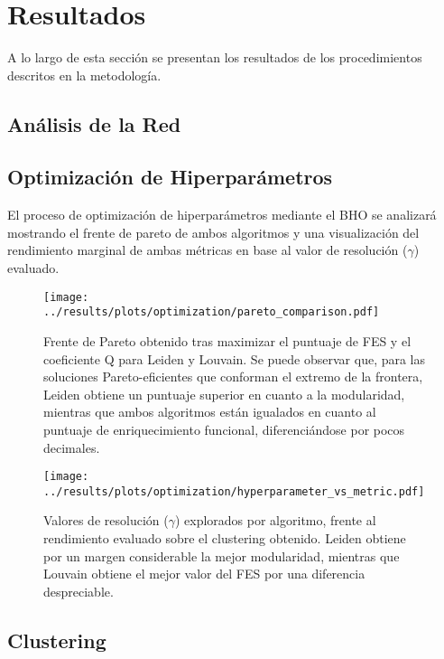 \section{Resultados}

A lo largo de esta sección se presentan los resultados de los procedimientos descritos en la metodología. 

\subsection{Análisis de la Red}

\subsection{Optimización de Hiperparámetros}

El proceso de optimización de hiperparámetros mediante el BHO se analizará mostrando el frente de pareto de ambos algoritmos y una visualización del rendimiento marginal de ambas métricas en base al valor de resolución (\(\gamma\)) evaluado.

\begin{figure}[htbp]
	\centering
	\texttt{[image: ../results/plots/optimization/pareto\_comparison.pdf]}
	\caption{Frente de Pareto obtenido tras maximizar el puntuaje de FES y el coeficiente Q para Leiden y Louvain. Se puede observar que, para las soluciones Pareto-eficientes que conforman el extremo de la frontera, Leiden obtiene un puntuaje superior en cuanto a la modularidad, mientras que ambos algoritmos están igualados en cuanto al puntuaje de enriquecimiento funcional, diferenciándose por pocos decimales.}
	\label{fig:pareto}
\end{figure}

\begin{figure}[htbp]
	\centering
	\texttt{[image: ../results/plots/optimization/hyperparameter\_vs\_metric.pdf]}
	\caption{Valores de resolución (\(\gamma\)) explorados por algoritmo, frente al rendimiento evaluado sobre el clustering obtenido. Leiden obtiene por un margen considerable la mejor modularidad, mientras que Louvain obtiene el mejor valor del FES por una diferencia despreciable.}
	\label{fig:slice_plot}
\end{figure}


\subsection{Clustering}

